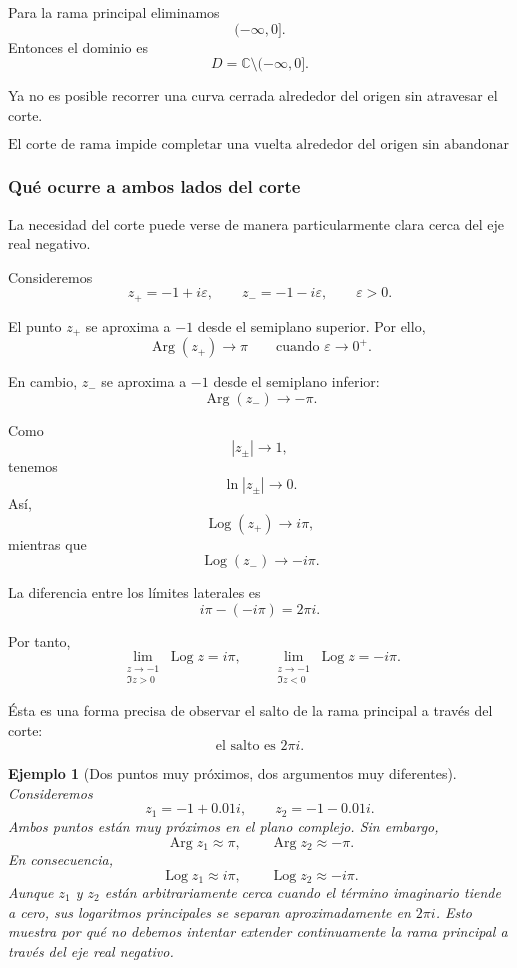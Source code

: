 \documentclass[12pt]{article}
\newtheorem{Ejem}{Ejemplo}
\DeclareMathOperator{\Arg}{Arg}
\DeclareMathOperator{\Log}{Log}
\begin{document}
Para la rama principal eliminamos
\[
(-\infty,0].
\]
Entonces el dominio es
\[
D=\mathbb C\setminus(-\infty,0].
\]

Ya no es posible recorrer una curva cerrada alrededor del origen sin atravesar
el corte.

\[
\boxed{
\text{El corte de rama impide completar una vuelta alrededor del origen
sin abandonar el dominio.}
}
\]
\subsubsection*{Qué ocurre a ambos lados del corte}
La necesidad del corte puede verse de manera particularmente clara cerca del
eje real negativo.

Consideremos
\[
z_+=-1+i\varepsilon,
\qquad
z_-=-1-i\varepsilon,
\qquad \varepsilon>0.
\]

El punto $z_+$ se aproxima a $-1$ desde el semiplano superior. Por ello,
\[
\Arg(z_+)\longrightarrow\pi
\qquad
\text{cuando }\varepsilon\to0^+.
\]

En cambio, $z_-$ se aproxima a $-1$ desde el semiplano inferior:
\[
\Arg(z_-)\longrightarrow-\pi.
\]

Como
\[
|z_\pm|\longrightarrow1,
\]
tenemos
\[
\ln|z_\pm|\longrightarrow0.
\]
Así,
\[
\Log(z_+)\longrightarrow i\pi,
\]
mientras que
\[
\Log(z_-)\longrightarrow-i\pi.
\]

La diferencia entre los límites laterales es
\[
i\pi-(-i\pi)=2\pi i.
\]

Por tanto,
\[
\boxed{
\lim_{\substack{z\to-1\\\Im z>0}}\Log z=i\pi,
\qquad
\lim_{\substack{z\to-1\\\Im z<0}}\Log z=-i\pi.
}
\]

Ésta es una forma precisa de observar el salto de la rama principal a través
del corte:
\[
\boxed{\text{el salto es }2\pi i.}
\]

\begin{Ejem}[Dos puntos muy próximos, dos argumentos muy diferentes]
Consideremos
\[
z_1=-1+0.01i,
\qquad
z_2=-1-0.01i.
\]
Ambos puntos están muy próximos en el plano complejo. Sin embargo,
\[
\Arg z_1\approx\pi,
\qquad
\Arg z_2\approx-\pi.
\]
En consecuencia,
\[
\Log z_1\approx i\pi,
\qquad
\Log z_2\approx-i\pi.
\]
Aunque $z_1$ y $z_2$ están arbitrariamente cerca cuando el término imaginario
tiende a cero, sus logaritmos principales se separan aproximadamente en
$2\pi i$. Esto muestra por qué no debemos intentar extender continuamente la
rama principal a través del eje real negativo.
\end{Ejem}
\end{document}

